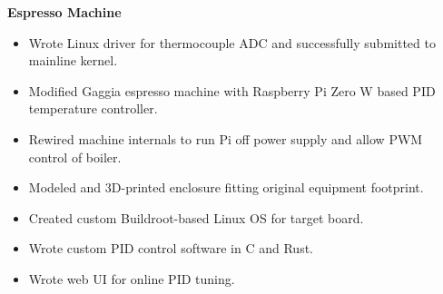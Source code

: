 \noindent \textbf{Espresso Machine}
\begin{itemize}
    \item Wrote Linux driver for thermocouple ADC and successfully submitted to mainline kernel.
    \item Modified Gaggia espresso machine with Raspberry Pi Zero W based PID temperature controller.
    \item Rewired machine internals to run Pi off power supply and allow PWM control of boiler.
    \item Modeled and 3D-printed enclosure fitting original equipment footprint.
    \item Created custom Buildroot-based Linux OS for target board.
    \item Wrote custom PID control software in C and Rust.
    \item Wrote web UI for online PID tuning.
\end{itemize}
